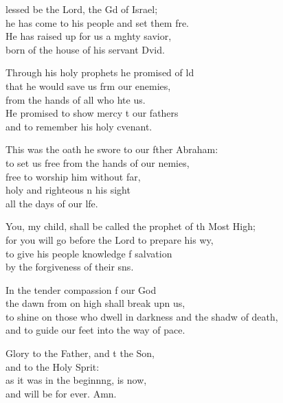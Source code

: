 \begin{psalmverse}
  \begin{patverse}
lessed be the Lord, the Gd of Israel;\Med\\
he has come to his people and set them fre.\\
He has raised up for us a m\pointup{\i}ghty savior,\Med\\
born of the house of his servant Dvid.

Through his holy prophets he promised of ld\Flex\\
that he would save us frm our enemies,\Med\\
from the hands of all who hte us.\\
He promised to show mercy t our fathers\Med\\
and to remember his holy cvenant.

This was the oath he swore to our fther Abraham:\Med\\
to set us free from the hands of our nemies,\\
free to worship him without far,\Flex\\
holy and righteous \pointup{\i}n his sight\Med\\
all the days of our l\pointup{\i}fe.

You, my child, shall be called the prophet of th Most High;\Med\\
for you will go before the Lord to prepare his wy,\\
to give his people knowledge f salvation\Med\\
by the forgiveness of their s\pointup{\i}ns.

In the tender compassion f our God\Med\\
the dawn from on high shall break upn us,\\
to shine on those who dwell in darkness and the shadw of death,\Med\\
and to guide our feet into the way of pace.

Glory to the Father, and t the Son,\Med\\
and to the Holy Sp\pointup{\i}rit:\\
as it was in the beginn\pointup{\i}ng, is now,\Med\\
and will be for ever. Amn.
  \end{patverse}
  \end{psalmverse}
